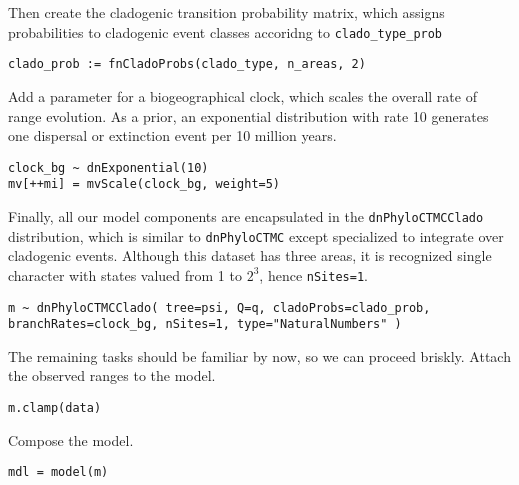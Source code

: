 Then create the cladogenic transition probability matrix, which assigns probabilities to cladogenic event classes accoridng to {\tt clado\_type\_prob}

\begin{snugshade}
\begin{lstlisting}
clado_prob := fnCladoProbs(clado_type, n_areas, 2)
\end{lstlisting}
\end{snugshade}

Add a parameter for a biogeographical clock, which scales the overall rate of range evolution.
As a prior, an exponential distribution with rate 10 generates one dispersal or extinction event per 10 million years.

\begin{snugshade}
\begin{lstlisting}
clock_bg ~ dnExponential(10)
mv[++mi] = mvScale(clock_bg, weight=5)
\end{lstlisting}
\end{snugshade}

Finally, all our model components are encapsulated in the {\tt dnPhyloCTMCClado} distribution, which is similar to {\tt dnPhyloCTMC} except specialized to integrate over cladogenic events. Although this dataset has three areas, it is recognized single character with states valued from 1 to $2^3$, hence {\tt nSites=1}.

\begin{snugshade}
\begin{lstlisting}
m ~ dnPhyloCTMCClado( tree=psi, Q=q, cladoProbs=clado_prob, branchRates=clock_bg, nSites=1, type="NaturalNumbers" )
\end{lstlisting}
\end{snugshade}

The remaining tasks should be familiar by now, so we can proceed briskly. Attach the observed ranges to the model.

\begin{snugshade}
\begin{lstlisting}
m.clamp(data)
\end{lstlisting}
\end{snugshade}

Compose the model.

\begin{snugshade}
\begin{lstlisting}
mdl = model(m)
\end{lstlisting}
\end{snugshade}

